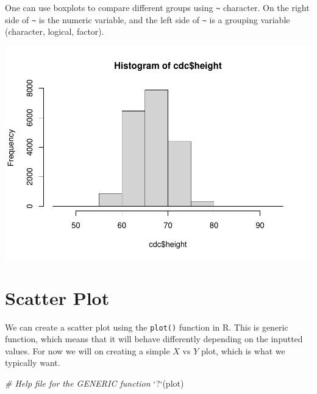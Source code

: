 \documentclass[
]{book}
\newenvironment{Shaded}{\begin{snugshade}}{\end{snugshade}}
\newcommand{\CommentTok}[1]{\textcolor[rgb]{0.56,0.35,0.01}{\textit{#1}}}
\newcommand{\DataTypeTok}[1]{\textcolor[rgb]{0.13,0.29,0.53}{#1}}
\newcommand{\DecValTok}[1]{\textcolor[rgb]{0.00,0.00,0.81}{#1}}
\newcommand{\KeywordTok}[1]{\textcolor[rgb]{0.13,0.29,0.53}{\textbf{#1}}}
\newcommand{\NormalTok}[1]{#1}
\newcommand{\OperatorTok}[1]{\textcolor[rgb]{0.81,0.36,0.00}{\textbf{#1}}}
\newcommand{\StringTok}[1]{\textcolor[rgb]{0.31,0.60,0.02}{#1}}
\begin{document}
One can use boxplots to compare different groups using \texttt{\textasciitilde{}} character. On the right side of \texttt{\textasciitilde{}} is the numeric variable, and the left side of \texttt{\textasciitilde{}} is a grouping variable (character, logical, factor).

\begin{Shaded}
\end{Shaded}

\includegraphics{_main_files/figure-latex/unnamed-chunk-231-1.pdf}

\hypertarget{scatter-plot}{%
\section{Scatter Plot}\label{scatter-plot}}

We can create a scatter plot using the \texttt{plot()} function in R. This is generic function, which means that it will behave differently depending on the inputted values. For now we will on creating a simple \(X\) vs \(Y\) plot, which is what we typically want.

\begin{Shaded}
\begin{Highlighting}[]
\CommentTok{# Help file for the GENERIC function}
\StringTok{`}\DataTypeTok{?}\StringTok{`}\NormalTok{(plot)}
\end{Highlighting}
\end{Shaded}
\end{document}
